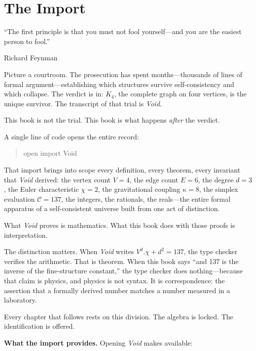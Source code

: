 \documentclass[11pt,a4paper]{book}
\def\cdot{.}%
\def\texttt#1{#1}%
\begin{document}
\chapter{The Import}
\label{ch:the-import}

\epigraph{``The first principle is that you must not fool yourself---and you are the easiest person to fool.''}{Richard Feynman}

Picture a courtroom. The prosecution has spent months---thousands of lines of formal argument---establishing which structures survive self-consistency and which collapse. The verdict is in: $K_4$, the complete graph on four vertices, is the unique survivor. The transcript of that trial is \textit{Void}.

This book is not the trial. This book is what happens \emph{after} the verdict.

A single line of code opens the entire record:

\begin{quote}
\texttt{open import Void}
\end{quote}

That import brings into scope every definition, every theorem, every invariant that \textit{Void} derived: the vertex count $V = 4$, the edge count $E = 6$, the degree $d = 3$, the Euler characteristic $\chi = 2$, the gravitational coupling $\kappa = 8$, the simplex evaluation $\mathcal{C} = 137$, the integers, the rationals, the reals---the entire formal apparatus of a self-consistent universe built from one act of distinction.

What \textit{Void} proves is mathematics. What this book does with those proofs is interpretation.

The distinction matters. When \textit{Void} writes $V^d \cdot \chi + d^2 = 137$, the type checker verifies the arithmetic. That is theorem. When this book says ``and 137 is the inverse of the fine-structure constant,'' the type checker does nothing---because that claim is physics, and physics is not syntax. It is correspondence: the assertion that a formally derived number matches a number measured in a laboratory.

Every chapter that follows rests on this division. The algebra is locked. The identification is offered.

\medskip

\noindent\textbf{What the import provides.} Opening \textit{Void} makes available:
\end{document}
